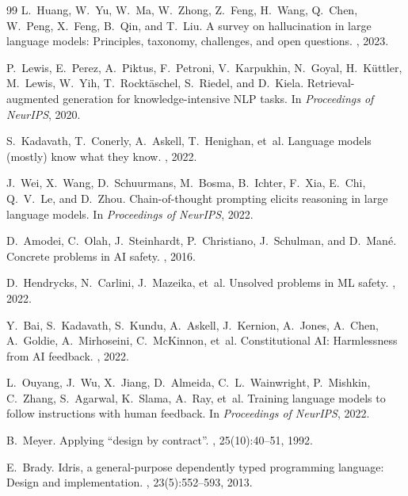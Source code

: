 \documentclass[11pt,a4paper]{article}
\begin{document}
\begin{thebibliography}{99}
L.~Huang, W.~Yu, W.~Ma, W.~Zhong, Z.~Feng, H.~Wang, Q.~Chen, W.~Peng,
X.~Feng, B.~Qin, and T.~Liu.
\newblock A survey on hallucination in large language models: Principles,
  taxonomy, challenges, and open questions.
, 2023.

P.~Lewis, E.~Perez, A.~Piktus, F.~Petroni, V.~Karpukhin, N.~Goyal,
H.~K{\"u}ttler, M.~Lewis, W.~Yih, T.~Rockt{\"a}schel, S.~Riedel, and
D.~Kiela.
\newblock Retrieval-augmented generation for knowledge-intensive {NLP} tasks.
\newblock In {\em Proceedings of NeurIPS}, 2020.

S.~Kadavath, T.~Conerly, A.~Askell, T.~Henighan, et~al.
\newblock Language models (mostly) know what they know.
, 2022.

J.~Wei, X.~Wang, D.~Schuurmans, M.~Bosma, B.~Ichter, F.~Xia, E.~Chi,
Q.~V.~Le, and D.~Zhou.
\newblock Chain-of-thought prompting elicits reasoning in large language models.
\newblock In {\em Proceedings of NeurIPS}, 2022.

D.~Amodei, C.~Olah, J.~Steinhardt, P.~Christiano, J.~Schulman, and D.~Man{\'e}.
\newblock Concrete problems in {AI} safety.
, 2016.

D.~Hendrycks, N.~Carlini, J.~Mazeika, et~al.
\newblock Unsolved problems in {ML} safety.
, 2022.

Y.~Bai, S.~Kadavath, S.~Kundu, A.~Askell, J.~Kernion, A.~Jones,
A.~Chen, A.~Goldie, A.~Mirhoseini, C.~McKinnon, et~al.
\newblock Constitutional {AI}: Harmlessness from {AI} feedback.
, 2022.

L.~Ouyang, J.~Wu, X.~Jiang, D.~Almeida, C.~L.~Wainwright, P.~Mishkin,
C.~Zhang, S.~Agarwal, K.~Slama, A.~Ray, et~al.
\newblock Training language models to follow instructions with human feedback.
\newblock In {\em Proceedings of NeurIPS}, 2022.

B.~Meyer.
\newblock Applying ``design by contract''.
, 25(10):40--51, 1992.

E.~Brady.
\newblock Idris, a general-purpose dependently typed programming language:
  Design and implementation.
, 23(5):552--593, 2013.


\end{thebibliography}
\end{document}
